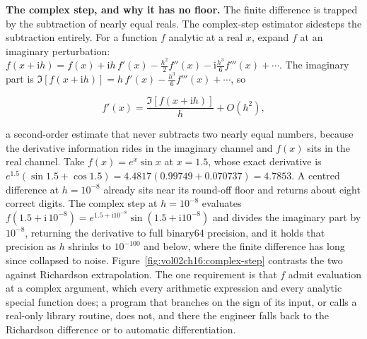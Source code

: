 \begin{example}
\textbf{The complex step, and why it has no floor.} The finite difference is
trapped by the subtraction of nearly equal reals. The complex-step estimator
sidesteps the subtraction entirely. For a function $f$ analytic at a real $x$,
expand $f$ at an imaginary perturbation: $f(x + \mathrm{i}h) = f(x) +
\mathrm{i}h\,f'(x) - \tfrac{h^{2}}{2}f''(x) - \mathrm{i}\tfrac{h^{3}}{6}
f'''(x) + \cdots$. The imaginary part is $\Im[f(x + \mathrm{i}h)] = h\,f'(x) -
\tfrac{h^{3}}{6}f'''(x) + \cdots$, so

\[
f'(x) = \frac{\Im[f(x + \mathrm{i}h)]}{h} + O(h^{2}),
\]

a second-order estimate that never subtracts two nearly equal numbers, because
the derivative information rides in the imaginary channel and $f(x)$ sits in
the real channel. Take $f(x) = e^{x}\sin x$ at $x = 1.5$, whose exact
derivative is $e^{1.5}(\sin 1.5 + \cos 1.5) = 4.4817(0.99749 + 0.070737) =
4.7853$. A centred difference at $h = 10^{-8}$ already sits near its
round-off floor and returns about eight correct digits. The complex step at
$h = 10^{-8}$ evaluates $f(1.5 + \mathrm{i}\,10^{-8}) = e^{1.5 +
\mathrm{i}10^{-8}}\sin(1.5 + \mathrm{i}10^{-8})$ and divides the imaginary part
by $10^{-8}$, returning the derivative to full binary64 precision, and it holds
that precision as $h$ shrinks to $10^{-100}$ and below, where the finite
difference has long since collapsed to noise.
Figure~\ref{fig:vol02ch16:complex-step} contrasts the two against Richardson
extrapolation. The one requirement is that $f$ admit evaluation at a complex
argument, which every arithmetic expression and every analytic special
function does; a program that branches on the sign of its input, or calls a
real-only library routine, does not, and there the engineer falls back to the
Richardson difference or to automatic differentiation.
\end{example}



